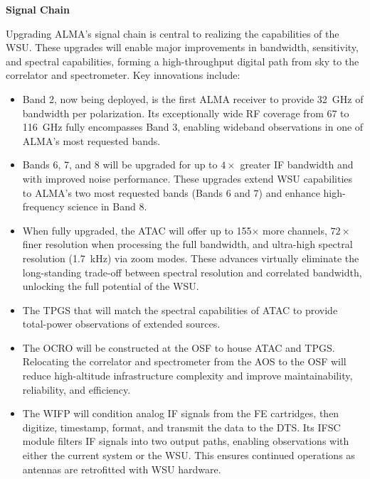 \clearpage
\noindent\textbf{Signal Chain}

Upgrading ALMA’s signal chain is central to realizing the capabilities of the WSU.
These upgrades will enable major improvements in bandwidth, sensitivity, and spectral capabilities, forming a high-throughput digital path from sky to the correlator and spectrometer. Key innovations include:

\begin{itemize}[itemsep=-0.5em]
\item Band 2, now being deployed, is the first ALMA receiver to provide 32~GHz of bandwidth per polarization. Its exceptionally wide \ac{RF} coverage from 67 to 116~GHz fully encompasses Band 3, enabling wideband observations in one of ALMA’s most requested bands.
%
\item Bands 6, 7, and 8 will be upgraded for up to $4\times$ greater \ac{IF} bandwidth and with improved noise performance. These upgrades extend WSU capabilities to ALMA’s two most requested bands (Bands 6 and 7) and enhance high-frequency science in Band 8.
%
\item When fully upgraded, the \ac{ATAC} will   offer up to 155$\times$ more channels, $72\times$ finer resolution when processing the full bandwidth, and ultra-high spectral resolution (1.7~kHz) via zoom modes. These advances virtually eliminate the long-standing trade-off between spectral resolution and correlated bandwidth, unlocking the full potential of the WSU.
%
%
\item The \ac{TPGS} that will match the spectral capabilities of \ac{ATAC} to provide total-power observations of extended sources.
\item The \ac{OCRO} will be constructed at the \ac{OSF} to house \ac{ATAC} and \ac{TPGS}. Relocating the correlator and  spectrometer from the \ac{AOS} to the \ac{OSF} will reduce high-altitude infrastructure complexity and improve maintainability, reliability, and efficiency.
%
\item The \ac{WIFP} will condition analog \ac{IF} signals from the \acl{FE} cartridges, then digitize, timestamp, format, and transmit the data to the \ac{DTS}. Its \acl{IFSC} module filters \ac{IF} signals into two output paths, enabling observations with either the current system or the WSU. This ensures continued operations as antennas are retrofitted with WSU hardware.

\end{itemize}
